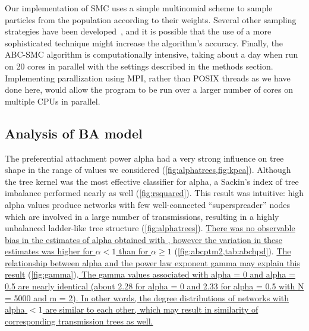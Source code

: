 Our implementation of \gls{SMC} uses a simple multinomial scheme to sample
particles from the population according to their weights. Several other
sampling strategies have been developed~\autocite{douc2005comparison}, and it
is possible that the use of a more sophisticated technique might increase the
algorithm's accuracy. Finally, the \gls{ABC}-\gls{SMC} algorithm is
computationally intensive, taking about a day when run on 20 cores in parallel
with the settings described in the methods section. Implementing parallization
using MPI, rather than POSIX threads as we have done here, would allow the
program to be run over a larger number of cores on multiple CPUs in parallel.

\subsection{Analysis of \acrlong{BA} model}

The preferential attachment power \gls{alpha} had a very strong influence on
tree shape in the range of values we considered
(\cref{fig:alphatrees,fig:kpca}). Although the tree kernel was the most
effective classifier for \gls{alpha}, a Sackin's index of tree imbalance
performed nearly as well (\cref{fig:rsquared}). This result was intuitive: high
\gls{alpha} values produce networks with few well-connected ``superspreader''
nodes which are involved in a large number of transmissions, resulting in a
highly unbalanced ladder-like tree structure (\cref{fig:alphatrees}). 
\uline{
There was no observable bias in the estimates of \gls{alpha} obtained with
, however the variation in these estimates was higher for
$\alpha < 1$ than for $\alpha \geq 1$} (\cref{fig:abcptm2,tab:abchpd}). \uline{The
relationship between \gls{alpha} and the power law exponent \gls{gamma} may
explain this result} (\cref{fig:gamma}).\uline{ The \gls{gamma} values associated with
\gls{alpha} = 0 and \gls{alpha} = 0.5 are nearly identical (about 2.28 for
\gls{alpha} = 0 and 2.33 for \gls{alpha} = 0.5 with \gls{N} = 5000 and \gls{m}
= 2). In other words, the degree distributions of networks with \gls{alpha} $<
1$ are similar to each other, which may result in similarity of corresponding
transmission trees as well. 
}

